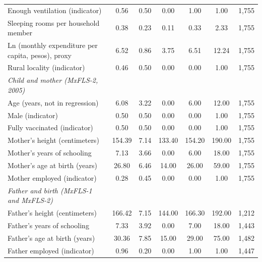 \documentclass[12pt]{article}
\begin{document}
{\begin{tabular}{l*{6}{c}}
Enough ventilation (indicator)&        0.56&        0.50&        0.00&        1.00&        1.00&       1,755\\
Sleeping rooms per household member&        0.38&        0.23&        0.11&        0.33&        2.33&       1,755\\
Ln (monthly expenditure per capita, pesos), proxy&        6.52&        0.86&        3.75&        6.51&       12.24&       1,755\\
Rural locality (indicator)&        0.46&        0.50&        0.00&        0.00&        1.00&       1,755\\
\addlinespace[6pt]\textit{Child and mother (MxFLS-2, 2005)}&            &            &            &            &            &            \\
Age (years, not in regression)&        6.08&        3.22&        0.00&        6.00&       12.00&       1,755\\
Male (indicator)    &        0.50&        0.50&        0.00&        0.00&        1.00&       1,755\\
Fully vaccinated (indicator)&        0.50&        0.50&        0.00&        0.00&        1.00&       1,755\\
Mother's height (centimeters)&      154.39&        7.14&      133.40&      154.20&      190.00&       1,755\\
Mother's years of schooling&        7.13&        3.66&        0.00&        6.00&       18.00&       1,755\\
Mother's age at birth (years)&       26.80&        6.46&       14.00&       26.00&       59.00&       1,755\\
Mother employed (indicator)&        0.28&        0.45&        0.00&        0.00&        1.00&       1,755\\
\addlinespace[6pt]\textit{Father and birth (MxFLS-1 and MxFLS-2)}&            &            &            &            &            &            \\
Father's height (centimeters)&      166.42&        7.15&      144.00&      166.30&      192.00&       1,212\\
Father's years of schooling&        7.33&        3.92&        0.00&        7.00&       18.00&       1,443\\
Father's age at birth (years)&       30.36&        7.85&       15.00&       29.00&       75.00&       1,482\\
Father employed (indicator)&        0.96&        0.20&        0.00&        1.00&        1.00&       1,447\\

\end{tabular}}
\end{document}
